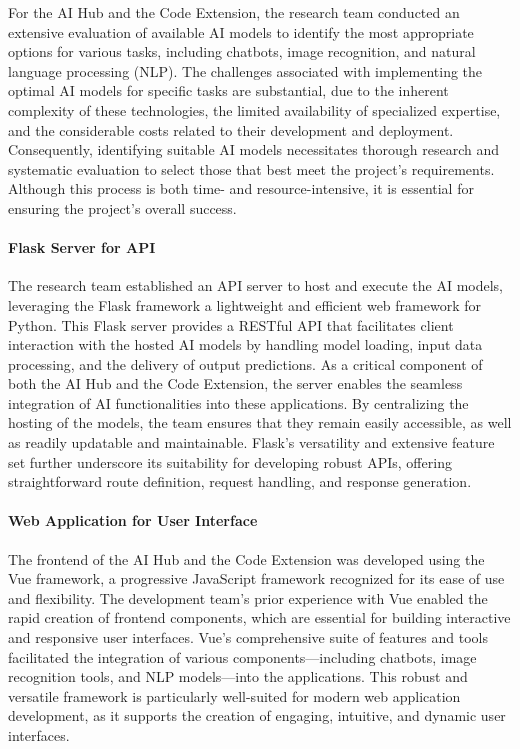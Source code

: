 For the AI Hub and the Code Extension, the research team conducted an extensive evaluation of available AI models to identify the most appropriate options for various tasks, including chatbots, image recognition, and natural language processing (NLP). The challenges associated with implementing the optimal AI models for specific tasks are substantial, due to the inherent complexity of these technologies, the limited availability of specialized expertise, and the considerable costs related to their development and deployment. Consequently, identifying suitable AI models necessitates thorough research and systematic evaluation to select those that best meet the project’s requirements. Although this process is both time- and resource-intensive, it is essential for ensuring the project’s overall success.

\paragraph{Flask Server for API}

The research team established an API server to host and execute the AI models, leveraging the Flask framework a lightweight and efficient web framework for Python. This Flask server provides a RESTful API that facilitates client interaction with the hosted AI models by handling model loading, input data processing, and the delivery of output predictions. As a critical component of both the AI Hub and the Code Extension, the server enables the seamless integration of AI functionalities into these applications. By centralizing the hosting of the models, the team ensures that they remain easily accessible, as well as readily updatable and maintainable. Flask’s versatility and extensive feature set further underscore its suitability for developing robust APIs, offering straightforward route definition, request handling, and response generation.

\paragraph{Web Application for User Interface}

The frontend of the AI Hub and the Code Extension was developed using the Vue framework, a progressive JavaScript framework recognized for its ease of use and flexibility. The development team’s prior experience with Vue enabled the rapid creation of frontend components, which are essential for building interactive and responsive user interfaces. Vue’s comprehensive suite of features and tools facilitated the integration of various components—including chatbots, image recognition tools, and NLP models—into the applications. This robust and versatile framework is particularly well-suited for modern web application development, as it supports the creation of engaging, intuitive, and dynamic user interfaces.

